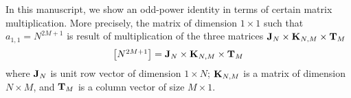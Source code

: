 In this manuscript, we show an odd-power identity in terms of certain matrix multiplication.
More precisely, the matrix of dimension $1 \times 1$ such that $a_{1,1} = N^{2M+1}$ is result of
multiplication of the three matrices ${\mathbf{J}} \sb{N} \times {\mathbf{K}} \sb{N, M} \times {\mathbf{T}} \sb{M}$
\[
    \begin{bmatrix}
        N^{2M+1}
    \end{bmatrix} = {\mathbf{J}} \sb{N} \times {\mathbf{K}} \sb{N, M} \times {\mathbf{T}} \sb{M}
\]
where ${\mathbf{J}} \sb{N}$ is unit row vector of dimension $1 \times N$; \quad
${\mathbf{K}} \sb{N, M}$ is a matrix of dimension $N \times M$,
and ${\mathbf{T}} \sb{M}$ is a column vector of size $M \times 1$.
